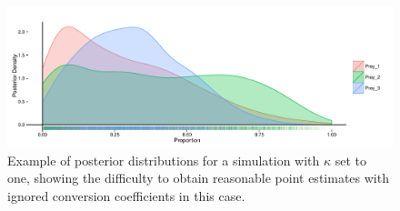 \documentclass[12pt]{article}
\begin{document}
\begin{figure}[H]
  \begin{center}    
      \includegraphics[width=1\textwidth]{figures/bad_cc_plot.pdf}  
       \caption{Example of posterior distributions for a simulation
         with $\kappa$ set to one, showing the difficulty to obtain
         reasonable point estimates with ignored conversion
         coefficients in this case.}
\label{fig:bad_cc_plot}
\end{center}
\end{figure}



\printbibliography
\end{document}
